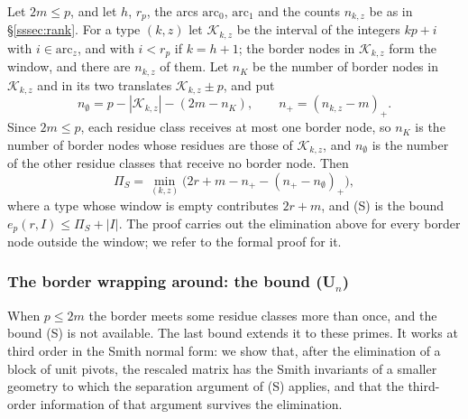 \documentclass[11pt]{amsart}
\theoremstyle{definition}
\theoremstyle{remark}
\numberwithin{equation}{section}
\begin{document}
Let $2m\le p$, and let $h$, $r_p$, the arcs $\mathrm{arc}_0$, $\mathrm{arc}_1$ and the counts $n_{k,z}$ be as in
\S\ref{sssec:rank}. For a type $(k,z)$ let $\mathcal K_{k,z}$ be the interval of the integers $kp+i$ with $i\in\mathrm{arc}_z$, and with
$i<r_p$ if $k=h+1$; the border nodes in $\mathcal K_{k,z}$ form the window, and there are $n_{k,z}$ of them. Let $n_K$ be the number
of border nodes in $\mathcal K_{k,z}$ and in its two translates $\mathcal K_{k,z}\pm p$, and put
\[
 n_\emptyset=p-|\mathcal K_{k,z}|-(2m-n_K),\qquad n_+=(n_{k,z}-m)_+ .
\]
Since $2m\le p$, each residue class receives at most one border node, so $n_K$ is the number of border nodes whose residues
are those of $\mathcal K_{k,z}$, and $n_\emptyset$ is the number of the other residue classes that receive no border node. Then
\begin{equation}\label{eq:PiS}
 \Pi_S=\min_{(k,z)}\bigl(2r+m-n_+-(n_+-n_\emptyset)_+\bigr),
\end{equation}
where a type whose window is empty contributes $2r+m$, and (S) is the bound $e_p(r,I)\le\Pi_S+|I|$. The proof carries out
the elimination above for every border node outside the window; we refer to the formal proof for it.

\subsubsection{The border wrapping around: the bound (U$_n$)}\label{sssec:wrap}
When $p\le2m$ the border meets some residue classes more than once, and the bound (S) is not available. The last bound
extends it to these primes. It works at third order in the Smith normal form: we show that, after the elimination of a
block of unit pivots, the rescaled matrix has the Smith invariants of a smaller geometry to which the separation argument of
(S) applies, and that the third-order information of that argument survives the elimination.
\end{document}
